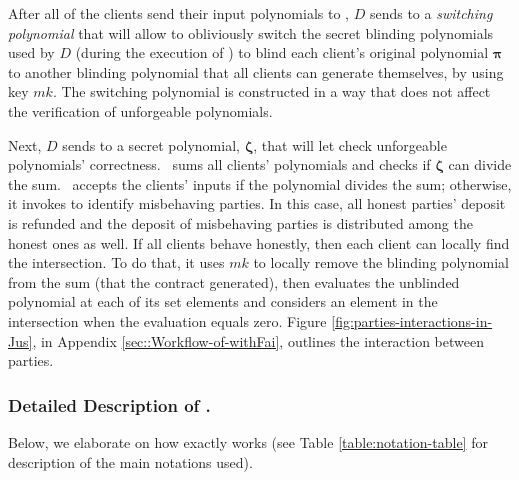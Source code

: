 After all of the clients send their input polynomials to \scf, $D$ sends to \scf a \emph{switching polynomial} that will allow \scf to obliviously switch the secret blinding polynomials used by $D$ (during the execution of \vopr) to blind each client's original polynomial $\bm\pi$  to another blinding polynomial that all clients can generate themselves, by using key $mk$.  The switching polynomial is constructed in a way that does not affect the verification of unforgeable polynomials. 




Next, $D$ sends to \scf a secret polynomial, $\bm\zeta$, that will let \scf check unforgeable polynomials' correctness. \scf\ sums all clients' polynomials and checks if $\bm\zeta$ can divide the sum. \scf\ accepts the clients' inputs if the polynomial divides the sum; otherwise, it invokes \aud to identify misbehaving parties.  In this case, all honest parties' deposit is refunded and the deposit of misbehaving parties is distributed among the honest ones as well. If all clients behave honestly,  then each client can locally find the intersection. To do that, it uses $mk$ to locally remove the blinding polynomial from the sum (that the contract generated), then evaluates the unblinded polynomial at each of its set elements and considers an element in the intersection when the evaluation equals zero. Figure \ref{fig:parties-interactions-in-Jus}, in Appendix \ref{sec::Workflow-of-withFai}, outlines the interaction between parties.


\vs

\subsubsection{Detailed Description of \fpsi.} Below, we elaborate on how \fpsi exactly works (see Table \ref{table:notation-table} for description of the main notations used). 

\vs

